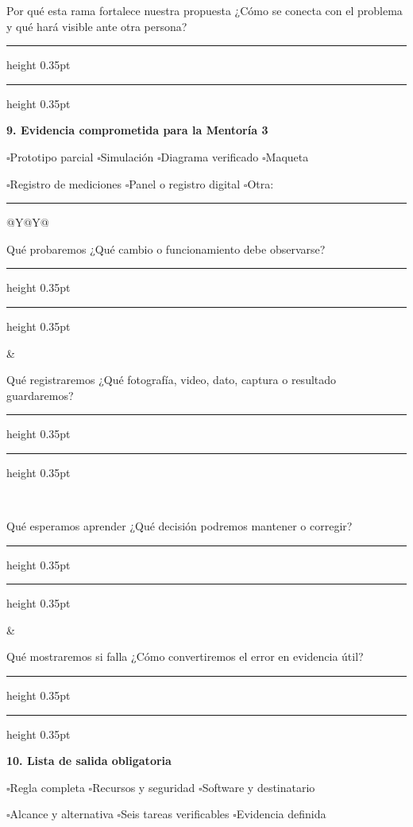 \documentclass[10pt,a4paper]{article}
\newcommand{\writearea}[1]{\vspace{#1}\hrule height 0.35pt\vspace{4mm}\hrule height 0.35pt}
\newcommand{\checkline}[1]{$\square$\hspace{1.5mm}#1}
\begin{document}
\begin{fieldbox}[height=33mm]{Por qué esta rama fortalece nuestra propuesta}
¿Cómo se conecta con el problema y qué hará visible ante otra persona?
\writearea{5mm}
\end{fieldbox}

{\large\bfseries\color{AIEPNavy}9. Evidencia comprometida para la Mentoría 3}\par
\begin{tcolorbox}[colback=AIEPBlueSoft,colframe=AIEPLine,boxrule=0.5pt,arc=1mm,left=3mm,right=3mm,top=2mm,bottom=2mm]
\checkline{Prototipo parcial}\hspace{4mm}
\checkline{Simulación}\hspace{4mm}
\checkline{Diagrama verificado}\hspace{4mm}
\checkline{Maqueta}\par
\checkline{Registro de mediciones}\hspace{4mm}
\checkline{Panel o registro digital}\hspace{4mm}
\checkline{Otra: \rule{31mm}{0.35pt}}
\end{tcolorbox}

\begin{tabularx}{\textwidth}{@{}Y@{\hspace{4mm}}Y@{}}
\begin{fieldbox}[height=39mm]{Qué probaremos}
¿Qué cambio o funcionamiento debe observarse?
\writearea{9mm}
\end{fieldbox}
&
\begin{fieldbox}[height=39mm]{Qué registraremos}
¿Qué fotografía, video, dato, captura o resultado guardaremos?
\writearea{9mm}
\end{fieldbox}
\\
\begin{fieldbox}[height=39mm]{Qué esperamos aprender}
¿Qué decisión podremos mantener o corregir?
\writearea{9mm}
\end{fieldbox}
&
\begin{fieldbox}[height=39mm]{Qué mostraremos si falla}
¿Cómo convertiremos el error en evidencia útil?
\writearea{9mm}
\end{fieldbox}
\end{tabularx}

{\large\bfseries\color{AIEPNavy}10. Lista de salida obligatoria}\par
\begin{tcolorbox}[colback=AIEPNavy,colframe=AIEPNavy,coltext=white,boxrule=0pt,arc=1mm,left=3mm,right=3mm,top=2.5mm,bottom=2.5mm]
\checkline{Regla completa}\hspace{4mm}
\checkline{Recursos y seguridad}\hspace{4mm}
\checkline{Software y destinatario}\par
\checkline{Alcance y alternativa}\hspace{4mm}
\checkline{Seis tareas verificables}\hspace{4mm}
\checkline{Evidencia definida}
\end{tcolorbox}
\end{document}
